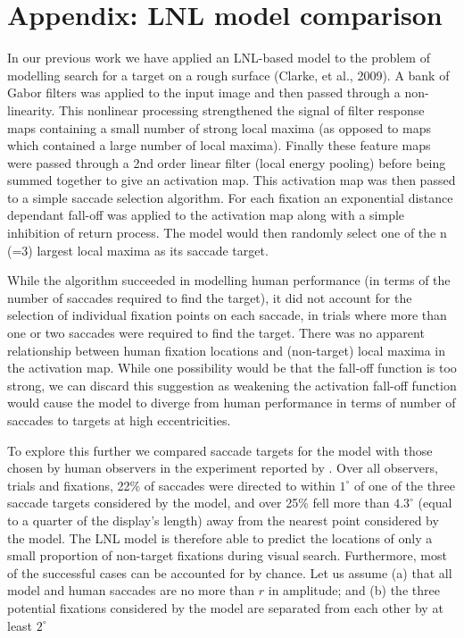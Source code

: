 \appendix
\section{Appendix: LNL model comparison}
\label{appendix:LNL}
In our previous work we have applied an LNL-based model to the problem of modelling search for a target on a rough surface (Clarke, et al., 2009). A bank of Gabor filters was applied to the input image and then passed through a non-linearity. This nonlinear processing strengthened the signal of filter response maps containing a small number of strong local maxima (as opposed to maps which contained a large number of local maxima). Finally these feature maps were passed through a 2nd order linear filter (local energy pooling) before being summed together to give an activation map. This activation map was then passed to a simple saccade selection algorithm. For each fixation an exponential distance dependant fall-off was applied to the activation map along with a simple inhibition of return process. The model would then randomly select one of the n (=3) largest local maxima as its saccade target.
\par
While the algorithm succeeded in modelling human performance (in terms of the number of saccades required to find the target), it did not account for the selection of individual fixation points on each saccade, in trials where more than one or two saccades were required to find the target. There was no apparent relationship between human fixation locations and (non-target) local maxima in the activation map. While one possibility would be that the fall-off function is too strong, we can discard this suggestion as weakening the activation fall-off function would cause the model to diverge from human performance in terms of number of saccades to targets at high eccentricities. 
\par
To explore this further we compared saccade targets for the model with those chosen by human observers  in the experiment reported by \cite{clarke2009}. Over all observers, trials and fixations, 22\% of saccades were directed to within $1^{\circ}$ of one of the three saccade targets considered by the model, and over 25\% fell more than $4.3^{\circ}$  (equal to a quarter of the display's length) away from the nearest point considered by the model.  The LNL model is therefore able to predict the locations of only a small proportion of non-target fixations during visual search. Furthermore, most of the successful cases can be accounted for by chance. Let us assume (a) that all model and human saccades are no more than $r$ in amplitude; and (b) 	the three potential fixations considered by the model are separated from each other by at least $2^{\circ}$
